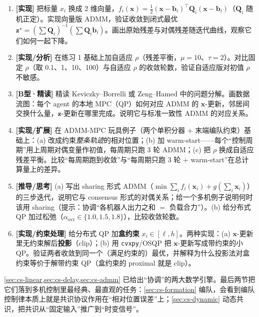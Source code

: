 \begin{practice}
\begin{enumerate}
  \item \textbf{[实现]} 把标量 $x_i$ 换成 2 维向量，$f_i(\mathbf{x})=\tfrac12(\mathbf{x}-\mathbf{b}_i)^\top\mathbf{Q}_i(\mathbf{x}-\mathbf{b}_i)$（$\mathbf{Q}_i$ 随机正定）。实现向量版 ADMM，验证收敛到闭式最优 $\mathbf{z}^\star=(\sum\mathbf{Q}_i)^{-1}(\sum\mathbf{Q}_i\mathbf{b}_i)$。画出原始残差与对偶残差随迭代曲线，观察它们如何一起下降。
  \item \textbf{[实现/分析]} 在练习 1 基础上加自适应 $\rho$（残差平衡，$\mu=10$、$\tau=2$）。对比固定 $\rho$（取 0.1、1、10、100）与自适应 $\rho$ 的收敛轮数，验证自适应版对初值 $\rho$ 不敏感。
  \item \textbf{[B型·精读]} 精读 Keviczky--Borrelli\cite{keviczky2008decentralized} 或 Zeng--Hamed\cite{zeng2026admmcbf} 中的问题分解。画数据流图：每个 agent 的本地 MPC（QP）如何对应 ADMM 的 $\mathbf{x}$-更新，邻居间交换什么量，$\mathbf{z}$-更新在哪里完成。说明它与标准一致性 ADMM 的对应关系。
  \item \textbf{[实现/扩展]} 在 ADMM-MPC 玩具例子（两个单积分器 + 末端编队约束）基础上：(a) 改成约束\emph{整条轨迹}的相对位置；(b) 加 warm-start——每个“控制周期”用上周期对偶变量作初值，每周期只跑 3 轮 ADMM；(c) 把 $\rho$ 换成自适应残差平衡。比较“每周期跑到收敛”与“每周期只跑 3 轮 + warm-start”在总计算量上的差异。
  \item \textbf{[推导/思考]} (a) 写出 sharing 形式 ADMM（$\min\sum_if_i(\mathbf{x}_i)+g(\sum_i\mathbf{x}_i)$）的三步迭代，说明它与 consensus 形式的对偶关系；给一个多机例子说明何时该用 sharing（提示：协调“各机器人出力之和 $=$ 负载合力”）。(b) 给分布式 QP 加过松弛（$\alpha_{\text{ovr}}\in\{1.0,1.5,1.8\}$），比较收敛轮数。
  \item \textbf{[实现/约束处理]} 给分布式 QP 加\textbf{盒约束} $x_i\in[\ell,h]$。两种实现：(a) $\mathbf{x}$-更新里无约束解后\textbf{投影}（clip）；(b) 用 \verb|cvxpy|/OSQP 把 $\mathbf{x}$-更新写成带约束的小 QP。验证两者收敛到同一个（满足约束的）最优，并解释为什么投影法对盒约束等价于解带约束 QP（盒约束的 proximal 就是 clip）。
\end{enumerate}
\end{practice}

\noindent \cref{sec:cs-linear,sec:cs-delay,sec:cs-admm} 已给出“协调”的两大数学引擎。最后两节把它们落到多机控制里最经典、最直观的任务：\cref{sec:cs-formation} 编队，会看到编队控制律本质上就是共识协议作用在“相对位置误差”上；\cref{sec:cs-dynamic} 动态共识，把共识从“固定输入”推广到“时变信号”。

